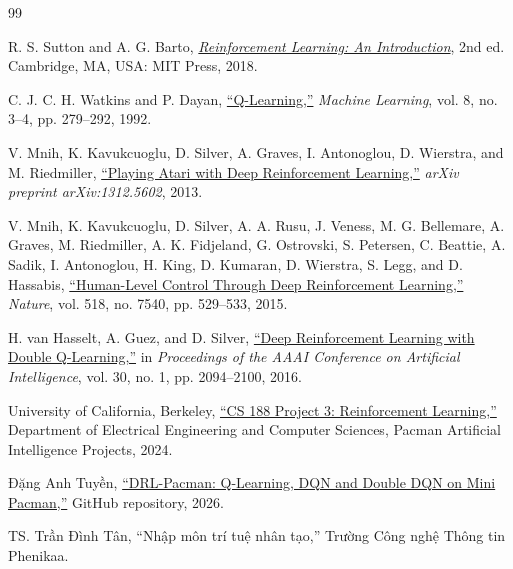 \newpage

\renewcommand{\refname}{TÀI LIỆU THAM KHẢO}

\begin{thebibliography}{99}

R. S. Sutton and A. G. Barto,
\href{http://incompleteideas.net/book/the-book-2nd.html}
{\textit{Reinforcement Learning: An Introduction}},
2nd ed.
Cambridge, MA, USA: MIT Press, 2018.

C. J. C. H. Watkins and P. Dayan,
\href{https://doi.org/10.1007/BF00992698}
{``Q-Learning,''}
\textit{Machine Learning},
vol. 8,
no. 3--4,
pp. 279--292,
1992.

V. Mnih, K. Kavukcuoglu, D. Silver, A. Graves,
I. Antonoglou, D. Wierstra, and M. Riedmiller,
\href{https://arxiv.org/abs/1312.5602}
{``Playing Atari with Deep Reinforcement Learning,''}
\textit{arXiv preprint arXiv:1312.5602},
2013.

V. Mnih, K. Kavukcuoglu, D. Silver, A. A. Rusu, J. Veness,
M. G. Bellemare, A. Graves, M. Riedmiller, A. K. Fidjeland,
G. Ostrovski, S. Petersen, C. Beattie, A. Sadik, I. Antonoglou,
H. King, D. Kumaran, D. Wierstra, S. Legg, and D. Hassabis,
\href{https://doi.org/10.1038/nature14236}
{``Human-Level Control Through Deep Reinforcement Learning,''}
\textit{Nature},
vol. 518,
no. 7540,
pp. 529--533,
2015.

H. van Hasselt, A. Guez, and D. Silver,
\href{https://doi.org/10.1609/aaai.v30i1.10295}
{``Deep Reinforcement Learning with Double Q-Learning,''}
in \textit{Proceedings of the AAAI Conference on Artificial Intelligence},
vol. 30, no. 1, pp. 2094--2100, 2016.

University of California, Berkeley,
\href{https://inst.eecs.berkeley.edu/~cs188/}
{``CS 188 Project 3: Reinforcement Learning,''}
Department of Electrical Engineering and Computer Sciences,
Pacman Artificial Intelligence Projects,
2024.

Đặng Anh Tuyền,
\href{https://github.com/tuyenda2011/DRL-Pacman}
{``DRL-Pacman: Q-Learning, DQN and Double DQN on Mini Pacman,''}
GitHub repository, 2026.

TS. Trần Đình Tân,
{``Nhập môn trí tuệ nhân tạo,''}
Trường Công nghệ Thông tin Phenikaa.

\end{thebibliography}
